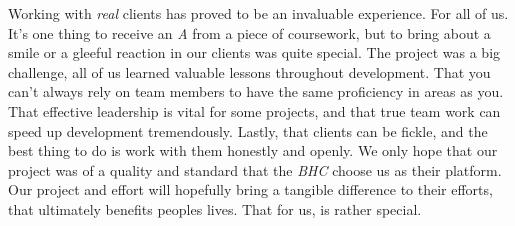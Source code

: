 \documentclass{l3proj}
\begin{document}
Working with \textit{real} clients has proved to be an invaluable experience. For all of us. It's one thing to receive an \textit{A} from a piece of coursework, but to bring about a smile or a gleeful reaction in our clients was quite special. The project was a big challenge, all of us learned valuable lessons throughout development. That you can't always rely on team members to have the same proficiency in areas as you. That effective leadership is vital for some projects, and that true team work can speed up development tremendously. Lastly, that clients can be fickle, and the best thing to do is work with them honestly and openly. We only hope that our project was of a quality and standard that the \textit{BHC} choose us as their platform. Our project and effort will hopefully bring a tangible difference to their efforts, that ultimately benefits peoples lives. That for us, is rather special.


\newpage
\printbibliography[title={Bibliography}]
\end{document}
